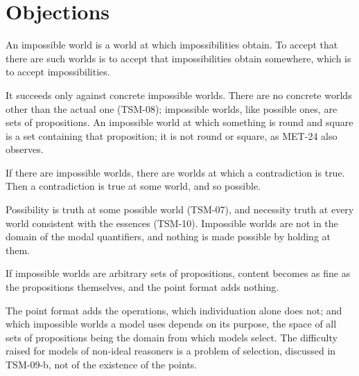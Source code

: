 \documentclass{situationist-preprint}
\begin{document}
\section{Objections}

\begin{objection}
An impossible world is a world at which impossibilities obtain. To accept that there are such worlds is to accept that impossibilities obtain somewhere, which is to accept impossibilities.
\end{objection}

\begin{reply}
It succeeds only against concrete impossible worlds. There are no concrete worlds other than the actual one (TSM-08); impossible worlds, like possible ones, are sets of propositions. An impossible world at which something is round and square is a set containing that proposition; it is not round or square, as MET-24 also observes.
\end{reply}

\begin{objection}
If there are impossible worlds, there are worlds at which a contradiction is true. Then a contradiction is true at some world, and so possible.
\end{objection}

\begin{reply}
Possibility is truth at some possible world (TSM-07), and necessity truth at every world consistent with the essences (TSM-10). Impossible worlds are not in the domain of the modal quantifiers, and nothing is made possible by holding at them.
\end{reply}

\begin{objection}
If impossible worlds are arbitrary sets of propositions, content becomes as fine as the propositions themselves, and the point format adds nothing.
\end{objection}

\begin{reply}
The point format adds the operations, which individuation alone does not; and which impossible worlds a model uses depends on its purpose, the space of all sets of propositions being the domain from which models select. The difficulty \citet{Bjerring2013} raised for models of non-ideal reasoners is a problem of selection, discussed in TSM-09-b, not of the existence of the points.
\end{reply}
\end{document}
